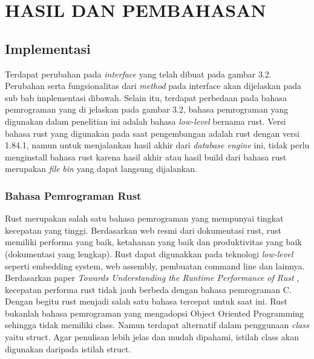 
\chapter{HASIL DAN PEMBAHASAN}

\section{Implementasi}

Terdapat perubahan pada \emph{interface} yang telah dibuat pada gambar 3.2. Perubahan serta fungsionalitas dari \emph{method} pada interface akan 
dijelaskan pada sub bab implementasi dibawah. Selain itu, terdapat perbedaan pada bahasa pemrograman yang di jelaskan pada gambar 3.2, bahasa pemrograman
yang digunakan dalam penelitian ini adalah bahasa \emph{low-level} bernama rust. Versi bahasa rust yang digunakan pada saat pengembangan adalah
rust dengan versi 1.84.1, namun untuk menjalankan hasil akhir dari \emph{database engine} ini, tidak perlu menginstall bahasa rust karena hasil akhir atau hasil build
dari bahasa rust merupakan \emph{file} \emph{bin} yang dapat langsung dijalankan.

\subsection{Bahasa Pemrograman Rust}
Rust merupakan salah satu bahasa pemrograman yang mempunyai tingkat kecepatan yang tinggi. Berdasarkan web resmi dari dokumentasi rust,
rust memiliki performa yang baik, ketahanan yang baik dan produktivitas yang baik (dokumentasi yang lengkap). Rust dapat digunakkan pada
teknologi \emph{low-level} seperti embedding system, web assembly, pembuatan command line dan lainnya. Berdasarkan paper \emph{Towards Understanding 
the Runtime Performance of Rust} \cite{yuchen2022}, kecepatan performa rust tidak jauh berbeda dengan bahasa pemrograman C. Dengan begitu rust 
menjadi salah satu bahasa tercepat untuk saat ini. Rust bukanlah bahasa pemrograman yang mengadopsi Object Oriented Programming sehingga 
tidak memiliki class. Namun terdapat alternatif dalam penggunaan \emph{class} yaitu struct. Agar penulisan lebih jelas dan mudah dipahami, istilah
class akan digunakan daripada istilah struct.


